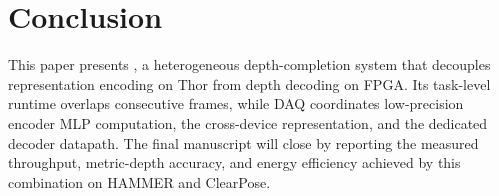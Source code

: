 \section{Conclusion}
\label{sec:conclusion}

This paper presents \system, a heterogeneous depth-completion system that
decouples representation encoding on Thor from depth decoding on FPGA.  Its
task-level runtime overlaps consecutive frames, while DAQ coordinates
low-precision encoder MLP computation, the cross-device representation, and
the dedicated decoder datapath.  The final manuscript will close by reporting
the measured throughput, metric-depth accuracy, and energy efficiency achieved
by this combination on HAMMER and ClearPose.
